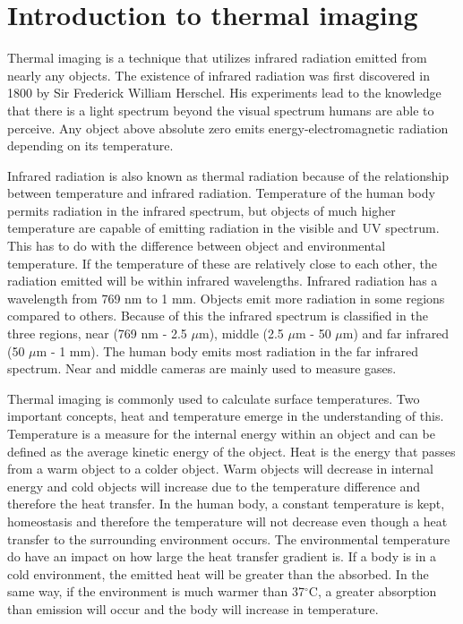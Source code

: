 \section{Introduction to thermal imaging}

Thermal imaging is a technique that utilizes infrared radiation emitted from nearly any objects. 
The existence of infrared radiation was first discovered in 1800 by Sir Frederick William Herschel. 
His experiments lead to the knowledge that there is a light spectrum beyond the visual spectrum humans are able to perceive. Any object above absolute zero emits energy-electromagnetic radiation depending on its temperature.\cite{ignacio2017,optris2009}

Infrared radiation is also known as thermal radiation because of the relationship between temperature and infrared radiation. Temperature of the human body permits radiation in the infrared spectrum, but objects of much higher temperature are capable of emitting radiation in the visible and UV spectrum. This has to do with the difference between object and environmental temperature. If the temperature of these are relatively close to each other, the radiation emitted will be within infrared wavelengths. Infrared radiation has a wavelength from 769 nm to 1 mm. Objects emit more radiation in some regions compared to others. Because of this the infrared spectrum is classified in the three regions, near (769 nm - 2.5 $\mu$m), middle (2.5 $\mu$m - 50 $\mu$m) and far infrared (50 $\mu$m - 1 mm). The human body emits most radiation in the far infrared spectrum. Near and middle cameras are mainly used to measure gases.\cite{ignacio2017}

Thermal imaging is commonly used to calculate surface temperatures. Two important concepts, heat and temperature emerge in the understanding of this. Temperature is a measure for the internal energy within an object and can be defined as the average kinetic energy of the object.
Heat is the energy that passes from a warm object to a colder object. Warm objects will decrease in internal energy and cold objects will increase due to the temperature difference and therefore the heat transfer. In the human body, a constant temperature is kept, homeostasis and therefore the temperature will not decrease even though a heat transfer to the surrounding environment occurs. The environmental temperature do have an impact on how large the heat transfer gradient is. If a body is in a cold environment, the emitted heat will be greater than the absorbed. In the same way, if the environment is much warmer than 37$^{\circ}$C, a greater absorption than emission will occur and the body will increase in temperature.\cite{ignacio2017} 


